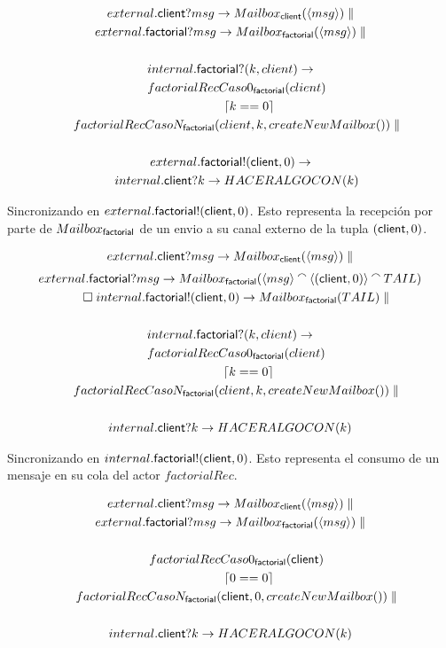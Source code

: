 \documentclass[fleqn]{article}
\newcommand{\myList}[1]{\langle #1 \rangle}
\newcommand{\myCons}[0]{\mathbin{\raise 0.8ex\hbox{$\smallfrown$}}}
\begin{document}
\begin{gather*}
external.\mbc?msg \rightarrow Mailbox_\mbc(\myList{msg}) \parallel \\
external.\mbf?msg \rightarrow Mailbox_\mbf(\myList{msg}) \parallel \\ \\
internal.\mbf?(k,client) \rightarrow \\
\quad factorialRecCaso0_\mbf(client) \\
\quad \qquad \lceil k == 0 \rceil \\
\quad factorialRecCasoN_\mbf(client, k, createNewMailbox()) \parallel \\ \\
external.\mbf!(\mbc,0) \rightarrow \\
\quad internal.\mbc?k \rightarrow HACERALGOCON(k)
\end{gather*}

Sincronizando en $external.\mathsf{factorial}!(\mathsf{client}, 0)$. Esto representa la recepción por
parte de $Mailbox_{\mathsf{factorial}}$ de un envio a su canal externo de la tupla $(\mathsf{client}, 0)$.

\begin{gather*}
external.\mbc?msg \rightarrow Mailbox_\mbc(\myList{msg}) \parallel  \\
external.\mbf?msg \rightarrow Mailbox_\mbf(\myList{msg} \myCons \myList{(\mbc,0)} \myCons TAIL) \\ 
\quad \square \; internal.\mbf!(\mbc,0) \rightarrow Mailbox_\mbf(TAIL) \parallel\\ \\
internal.\mbf?(k,client) \rightarrow \\
\quad factorialRecCaso0_\mbf(client) \\
\quad \qquad \lceil k == 0 \rceil \\
\quad factorialRecCasoN_\mbf(client, k, createNewMailbox()) \parallel \\ \\
internal.\mbc?k \rightarrow HACERALGOCON(k) 
\end{gather*}

Sincronizando en $internal.\mathsf{factorial}!(\mathsf{client},0)$. Esto representa el consumo de un
mensaje en su cola del actor $factorialRec$.

\begin{gather*}
external.\mbc?msg \rightarrow Mailbox_\mbc(\myList{msg}) \parallel \\
external.\mbf?msg \rightarrow Mailbox_\mbf(\myList{msg}) \parallel \\ \\
\quad factorialRecCaso0_\mbf(\mbc) \\
\quad \qquad \lceil 0 == 0 \rceil \\
\quad factorialRecCasoN_\mbf(\mbc, 0, createNewMailbox()) \parallel \\ \\
internal.\mbc?k \rightarrow HACERALGOCON(k)
\end{gather*}
\end{document}
